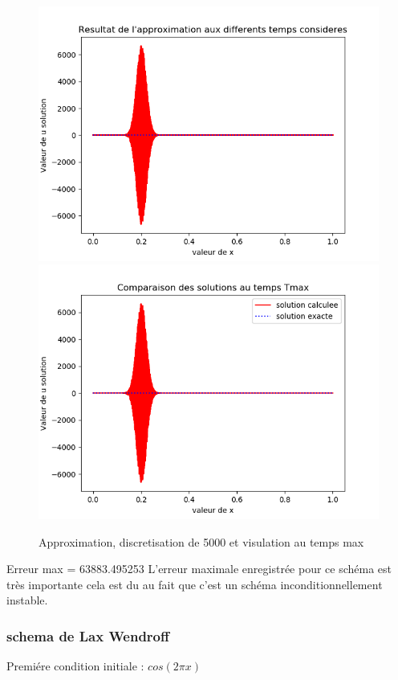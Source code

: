 \documentclass[12pt]{article}
\begin{document}
 \begin{figure}[H]
	\centering
	\includegraphics[scale=0.40]{1D_c1_5000_s2_init3.png}
	\includegraphics[scale=0.40]{1D_c1_5000_s2_i3.png}
	\caption{Approximation, discretisation de 5000 et visulation au temps max}
	\label{1D} 
	\end{figure}
Erreur max = 63883.495253
L'erreur maximale enregistrée pour ce schéma est très importante cela est du au fait que c'est un schéma inconditionnellement instable.
\subsubsection{schema de Lax Wendroff}
Premiére condition initiale : $cos(2 \pi x)$
\end{document}

